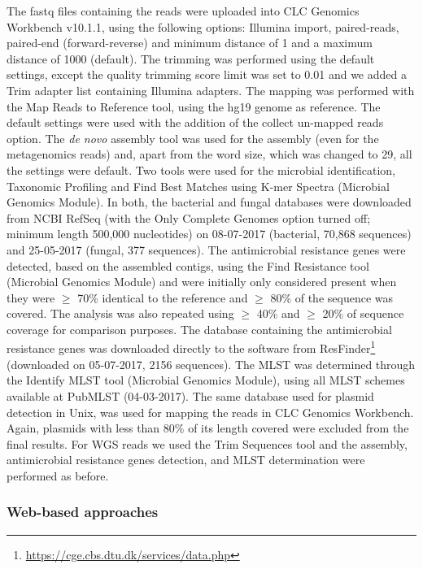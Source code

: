 The fastq files containing the reads were uploaded into CLC Genomics Workbench v10.1.1, using the following options: Illumina import, paired-reads, paired-end (forward-reverse) and minimum distance of 1 and a maximum distance of 1000 (default). 
The trimming was performed using the default settings, except the quality trimming score limit was set to 0.01 and we added a Trim adapter list containing Illumina adapters. 
The mapping was performed with the Map Reads to Reference tool, using the hg19 genome as reference. 
The default settings were used with the addition of the collect un-mapped reads option. The \textit{de novo} assembly tool was used for the assembly (even for the metagenomics reads) and, apart from the word size, which was changed to 29, all the settings were default. 
Two tools were used for the microbial identification, Taxonomic Profiling and Find Best Matches using K-mer Spectra (Microbial Genomics Module). 
In both, the bacterial and fungal databases were downloaded from NCBI RefSeq (with the Only Complete Genomes option turned off; minimum length 500,000 nucleotides) on 08-07-2017 (bacterial, 70,868 sequences) and 25-05-2017 (fungal, 377 sequences). 
The antimicrobial resistance genes were detected, based on the assembled contigs, using the Find Resistance tool (Microbial Genomics Module) and were initially only considered present when they were $\geq$ 70\% identical to the reference and $\geq$ 80\% of the sequence was covered. The analysis was also repeated using $\geq$ 40\% and $\geq$ 20\% of sequence coverage for comparison purposes. 
The database containing the antimicrobial resistance genes was downloaded directly to the software from ResFinder\footnote{\url{https://cge.cbs.dtu.dk/services/data.php}} (downloaded on 05-07-2017, 2156 sequences). The MLST was determined through the Identify MLST tool (Microbial Genomics Module), using all MLST schemes available at PubMLST (04-03-2017). 
The same database used for plasmid detection in Unix, was used for mapping the reads in CLC Genomics Workbench. Again, plasmids with less than 80\% of its length covered were excluded from the final results. 
For \ac{WGS} reads we used the Trim Sequences tool and the assembly, antimicrobial resistance genes detection, and MLST determination were performed as before.

\subsubsection{Web-based approaches}

